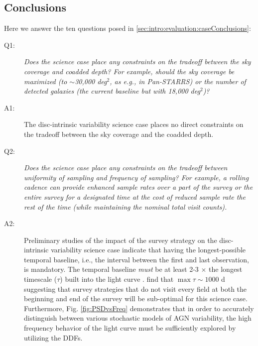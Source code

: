 %
\subsection{Conclusions}

Here we answer the ten questions posed in
\autoref{sec:intro:evaluation:caseConclusions}:

\begin{description}

\item[Q1:] {\it Does the science case place any constraints on the
tradeoff between the sky coverage and coadded depth? For example, should
the sky coverage be maximized (to $\sim$30,000 deg$^2$, as e.g., in
Pan-STARRS) or the number of detected galaxies (the current baseline but
with 18,000 deg$^2$)?}

\item[A1:] The disc-intrinsic variability science case places no direct
constraints on the tradeoff between the sky coverage and the coadded depth.

\item[Q2:] {\it Does the science case place any constraints on the
tradeoff between uniformity of sampling and frequency of sampling? For
example, a rolling cadence can provide enhanced sample rates over a part
of the survey or the entire survey for a designated time at the cost of
reduced sample rate the rest of the time (while maintaining the nominal
total visit counts).}

\item[A2:] Preliminary studies of the impact of the survey strategy on
the disc-intrinsic variability science case indicate that
having the longest-possible temporal baseline, i.e., the interval between
the first and last observation, is mandatory. The temporal baseline
\emph{must} be at least 2-3 $\times$ the longest timescale ($\tau$) built
into the light curve \citep{2017A&A...597A.128K}. \citet{2010ApJ...721.1014M}
find that $\max \tau \sim 1000$ d suggesting that survey strategies
that do not visit every field at both the beginning and end of the survey will
be sub-optimal for this science case.
Furthermore, Fig. \ref{fig:PSDvsFreq} demonstrates
that in order to accurately distinguish between various stochastic models of
AGN variability, the high frequency behavior of the light curve must be
sufficiently explored by utilizing the DDFs.


\end{description}

